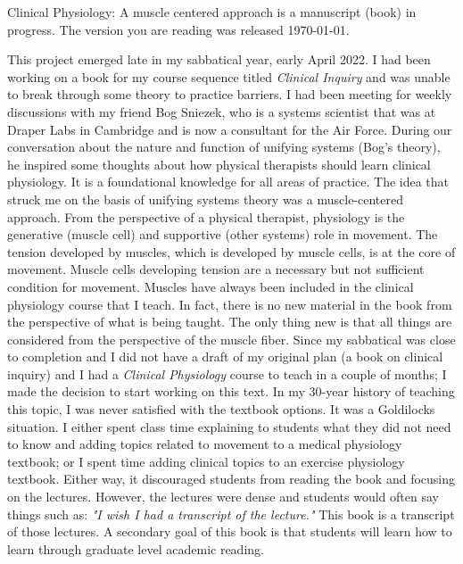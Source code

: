 
\preface

Clinical Physiology: A muscle centered approach is a manuscript (book) in progress. The version you are reading was released \today.

\vspace{0.2in}

This project emerged late in my sabbatical year, early April 2022. I had been working on a book for my course sequence titled \textit{Clinical Inquiry} and was unable to break through some theory to practice barriers. I had been meeting for weekly discussions with my friend Bog Sniezek, who is a systems scientist that was at Draper Labs in Cambridge and is now a consultant for the Air Force. During our conversation about the nature and function of unifying systems (Bog's theory), he inspired some thoughts about how physical therapists should learn clinical physiology. It is a foundational knowledge for all areas of practice. The idea that struck me on the basis of unifying systems theory was a muscle-centered approach. From the perspective of a physical therapist, physiology is the generative (muscle cell) and supportive (other systems) role in movement. The tension developed by muscles, which is developed by muscle cells, is at the core of movement. Muscle cells developing tension are a necessary but not sufficient condition for movement. Muscles have always been included in the clinical physiology course that I teach. In fact, there is no new material in the book from the perspective of what is being taught. The only thing new is that all things are considered from the perspective of the muscle fiber. Since my sabbatical was close to completion and I did not have a draft of my original plan (a book on clinical inquiry) and I had a \textit{Clinical Physiology} course to teach in a couple of months; I made the decision to start working on this text. In my 30-year history of teaching this topic, I was never satisfied with the textbook options. It was a Goldilocks situation. I either spent class time explaining to students what they did not need to know and adding topics related to movement to a medical physiology textbook; or I spent time adding clinical topics to an exercise physiology textbook. Either way, it discouraged students from reading the book and focusing on the lectures. However, the lectures were dense and students would often say things such as: \textit{"I wish I had a transcript of the lecture."} This book is a transcript of those lectures. A secondary goal of this book is that students will learn how to learn through graduate level academic reading.

